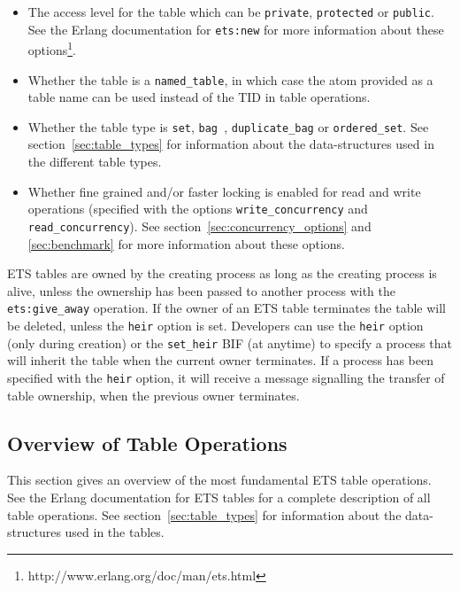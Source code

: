\documentclass[aps,pre,preprint,nofootinbib]{revtex4}
\begin{document}
\begin{itemize}
\item 
  The access level for the table which can be \verb|private|, \verb|protected| or \verb|public|.
  See the Erlang documentation for \verb|ets:new| for more information about these options\footnote{http://www.erlang.org/doc/man/ets.html}.
\item
  Whether the table is a \verb|named_table|, in which case the atom provided as a table name can be used instead of the TID in table operations.
\item 
  Whether the table type is \verb|set|, \verb|bag |, \verb|duplicate_bag| or \verb|ordered_set|. 
  See section~\ref{sec:table_types} for information about the data-structures used in the different table types.
\item 
  Whether fine grained and/or faster locking is enabled for read and write operations (specified with the options \verb|write_concurrency| and \verb|read_concurrency|). 
  See section~\ref{sec:concurrency_options} and \ref{sec:benchmark} for more information about these options.
\end{itemize}

ETS tables are owned by the creating process as long as the creating process is alive, unless the ownership has been passed to another process with the \verb|ets:give_away| operation.
If the owner of an ETS table terminates the table will be deleted, unless the \verb|heir| option is set.
Developers can use the \verb|heir| option (only during creation) or the \verb|set_heir| BIF (at anytime) to specify a process that will inherit the table when the current owner terminates. 
If a process has been specified with the \verb|heir| option, it will receive a message signalling the transfer of table ownership, when the previous owner terminates.

\subsection{Overview of Table Operations}

This section gives an overview of the most fundamental ETS table operations. 
See the Erlang documentation for ETS tables for a complete description of all table operations. 
See section~\ref{sec:table_types} for information about the data-structures used in the tables.
\end{document}

